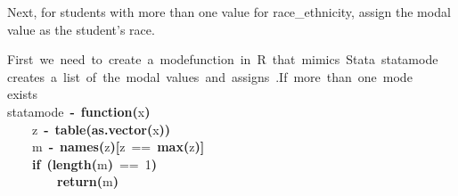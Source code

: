 \documentclass[12pt]{article}
\makeatletter
\newcommand{\hlnumber}[1]{\textcolor[rgb]{0,0,0}{#1}}%
\newcommand{\hlfunctioncall}[1]{\textcolor[rgb]{0.501960784313725,0,0.329411764705882}{\textbf{#1}}}%
\newcommand{\hlkeyword}[1]{\textcolor[rgb]{0,0,0}{\textbf{#1}}}%
\newcommand{\hlcomment}[1]{\textcolor[rgb]{0.180392156862745,0.6,0.341176470588235}{#1}}%
\newcommand{\hlformalargs}[1]{\textcolor[rgb]{0.690196078431373,0.250980392156863,0.0196078431372549}{#1}}%
\newcommand{\hlassignement}[1]{\textcolor[rgb]{0,0,0}{\textbf{#1}}}%
\newcommand{\hlsymbol}[1]{\textcolor[rgb]{0,0,0}{#1}}%
\newcommand{\hlstd}[1]{\textcolor[rgb]{0,0,0}{#1}}%
\newenvironment{kframe}{%
 \def\FrameCommand##1{\hskip\@totalleftmargin \hskip-\fboxsep
 \colorbox{shadecolor}{##1}\hskip-\fboxsep
     \hskip-\linewidth \hskip-\@totalleftmargin \hskip\columnwidth}%
 \MakeFramed {\advance\hsize-\width
   \@totalleftmargin\z@ \linewidth\hsize
   \@setminipage}}%
 {\par\unskip\endMakeFramed}
\newenvironment{knitrout}{}{} %
\renewenvironment{knitrout}{\begin{footnotesize}}{\end{footnotesize}}
\makeatother
\begin{document}
Next, for students with more than one value for race\_ethnicity, assign the modal value as the student's race.

\begin{knitrout}
\color{fgcolor}\begin{kframe}
\begin{flushleft}
\ttfamily\noindent
\hlcomment{\usebox{\hlnormalsizeboxhash}{\ }First{\ }we{\ }need{\ }to{\ }create{\ }a{\ }\usebox{\hlnormalsizeboxsinglequote}mode\usebox{\hlnormalsizeboxsinglequote}{\ }function{\ }in{\ }R{\ }that{\ }mimics{\ }Stata{\ }statamode}\hspace*{\fill}\\
\hlstd{}\hlcomment{\usebox{\hlnormalsizeboxhash}{\ }creates{\ }a{\ }list{\ }of{\ }the{\ }modal{\ }values{\ }and{\ }assigns{\ }\usebox{\hlnormalsizeboxsinglequote}.\usebox{\hlnormalsizeboxsinglequote}{\ }{\ }If{\ }more{\ }than{\ }one{\ }mode}\hspace*{\fill}\\
\hlstd{}\hlcomment{\usebox{\hlnormalsizeboxhash}{\ }exists}\hspace*{\fill}\\
\hlstd{}\hlsymbol{statamode}{\ }\hlassignement{\usebox{\hlnormalsizeboxlessthan}-}{\ }\hlkeyword{function}\hlkeyword{(}\hlformalargs{x}\hlkeyword{)}{\ }\hlkeyword{\usebox{\hlnormalsizeboxopenbrace}}\hspace*{\fill}\\
\hlstd{}{\ }{\ }{\ }{\ }\hlsymbol{z}{\ }\hlassignement{\usebox{\hlnormalsizeboxlessthan}-}{\ }\hlfunctioncall{table}\hlkeyword{(}\hlfunctioncall{as.vector}\hlkeyword{(}\hlsymbol{x}\hlkeyword{)}\hlkeyword{)}\hspace*{\fill}\\
\hlstd{}{\ }{\ }{\ }{\ }\hlsymbol{m}{\ }\hlassignement{\usebox{\hlnormalsizeboxlessthan}-}{\ }\hlfunctioncall{names}\hlkeyword{(}\hlsymbol{z}\hlkeyword{)}\hlkeyword{[}\hlsymbol{z}{\ }=={\ }\hlfunctioncall{max}\hlkeyword{(}\hlsymbol{z}\hlkeyword{)}\hlkeyword{]}\hspace*{\fill}\\
\hlstd{}{\ }{\ }{\ }{\ }\hlkeyword{if}{\ }\hlkeyword{(}\hlfunctioncall{length}\hlkeyword{(}\hlsymbol{m}\hlkeyword{)}{\ }=={\ }\hlnumber{1}\hlkeyword{)}{\ }\hlkeyword{\usebox{\hlnormalsizeboxopenbrace}}\hspace*{\fill}\\
\hlstd{}{\ }{\ }{\ }{\ }{\ }{\ }{\ }{\ }\hlfunctioncall{return}\hlkeyword{(}\hlsymbol{m}\hlkeyword{)}\hspace*{\fill}\\

\end{flushleft}
\end{kframe}
\end{knitrout}
\end{document}
